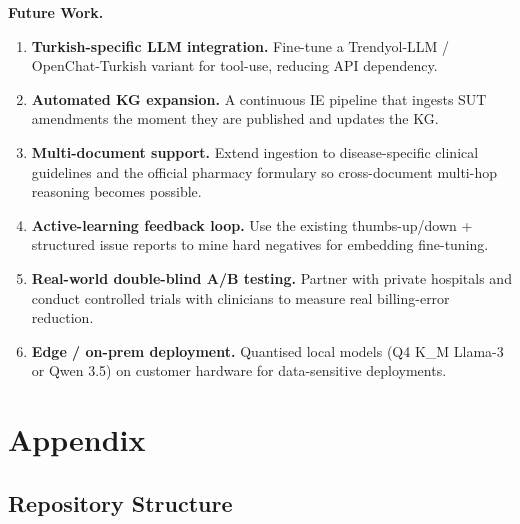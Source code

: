 \documentclass[11pt, a4paper]{article}
\begin{document}
\begin{itemize}[leftmargin=*]
\textbf{Future Work.}
\begin{enumerate}[leftmargin=*]
    \item \textbf{Turkish-specific LLM integration.} Fine-tune a Trendyol-LLM / OpenChat-Turkish variant for tool-use, reducing API dependency.
    \item \textbf{Automated KG expansion.} A continuous IE pipeline that ingests SUT amendments the moment they are published and updates the KG.
    \item \textbf{Multi-document support.} Extend ingestion to disease-specific clinical guidelines and the official pharmacy formulary so cross-document multi-hop reasoning becomes possible.
    \item \textbf{Active-learning feedback loop.} Use the existing thumbs-up/down + structured issue reports to mine hard negatives for embedding fine-tuning.
    \item \textbf{Real-world double-blind A/B testing.} Partner with private hospitals and conduct controlled trials with clinicians to measure real billing-error reduction.
    \item \textbf{Edge / on-prem deployment.} Quantised local models (Q4 K\_M Llama-3 or Qwen 3.5) on customer hardware for data-sensitive deployments.
\end{enumerate}

\section{Appendix}

\subsection{Repository Structure}


\end{itemize}
\end{document}
